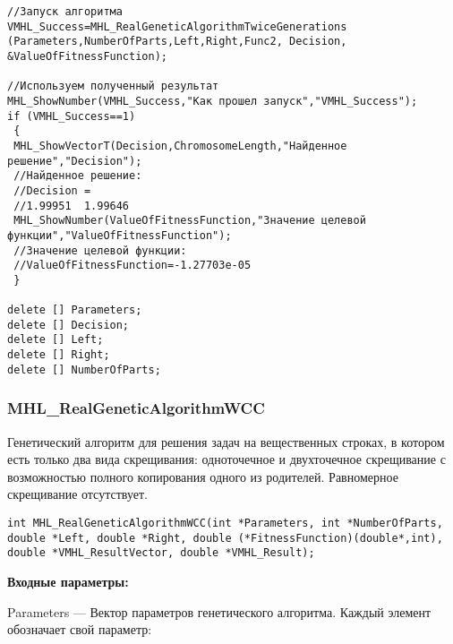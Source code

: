 \documentclass[a4paper,12pt]{article}
\begin{document}
\begin{lstlisting}[label=code_use_MHL_RealGeneticAlgorithmTwiceGenerations,caption=Пример использования]
//Запуск алгоритма
VMHL_Success=MHL_RealGeneticAlgorithmTwiceGenerations (Parameters,NumberOfParts,Left,Right,Func2, Decision, &ValueOfFitnessFunction);

//Используем полученный результат
MHL_ShowNumber(VMHL_Success,"Как прошел запуск","VMHL_Success");
if (VMHL_Success==1)
 {
 MHL_ShowVectorT(Decision,ChromosomeLength,"Найденное решение","Decision");
 //Найденное решение:
 //Decision =
 //1.99951	1.99646
 MHL_ShowNumber(ValueOfFitnessFunction,"Значение целевой функции","ValueOfFitnessFunction");
 //Значение целевой функции:
 //ValueOfFitnessFunction=-1.27703e-05
 }

delete [] Parameters;
delete [] Decision;
delete [] Left;
delete [] Right;
delete [] NumberOfParts;
\end{lstlisting}

\subsubsection{MHL\_RealGeneticAlgorithmWCC}\label{MHL_RealGeneticAlgorithmWCC}

Генетический алгоритм для решения задач на вещественных строках, в котором есть только два вида скрещивания: одноточечное и двухточечное скрещивание с возможностью полного копирования одного из родителей. Равномерное скрещивание отсутствует.


\begin{lstlisting}[label=code_syntax_MHL_RealGeneticAlgorithmWCC,caption=Синтаксис]
int MHL_RealGeneticAlgorithmWCC(int *Parameters, int *NumberOfParts, double *Left, double *Right, double (*FitnessFunction)(double*,int), double *VMHL_ResultVector, double *VMHL_Result);
\end{lstlisting}

\textbf{Входные параметры:}
 
Parameters --- Вектор параметров генетического алгоритма. Каждый элемент обозначает свой параметр:
 
\end{document}
